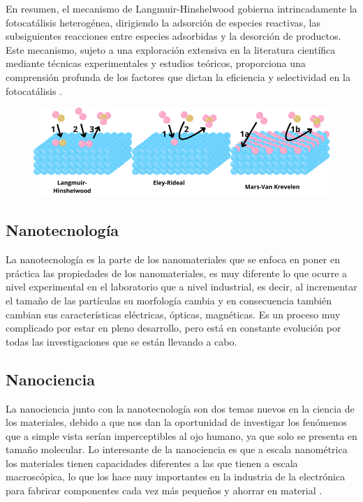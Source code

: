 \documentclass[12pt]{article}
\begin{document}
En resumen, el mecanismo de Langmuir-Hinshelwood gobierna intrincadamente la fotocatálisis heterogénea, dirigiendo la adsorción de especies reactivas, las subsiguientes reacciones entre especies adsorbidas y la desorción de productos. Este mecanismo, sujeto a una exploración extensiva en la literatura científica mediante técnicas experimentales y estudios teóricos, proporciona una comprensión profunda de los factores que dictan la eficiencia y selectividad en la fotocatálisis \cite{IEEEreferencias:Ref10}. 
\begin{figure}[H]
    	   \begin{center}
     	  	\includegraphics[width = 1\textwidth]{Imagenes/MetodosFotocatalisis.png}
    	   \end{center} 
        \end{figure}
\subsection{Nanotecnología}
    La nanotecnología es la parte de los nanomateriales que se enfoca en poner en práctica las propiedades de los nanomateriales, es muy diferente lo que ocurre a nivel experimental en el laboratorio que a nivel industrial, es decir, al incrementar el tamaño de las partículas su morfología cambia y en consecuencia también cambian sus características eléctricas, ópticas, magnéticas. Es un proceso muy complicado por estar en pleno desarrollo, pero está en constante evolución por todas las investigaciones que se están llevando a cabo.\cite{IEEEreferencias:Ref1}
    \subsection{Nanociencia}
    La nanociencia junto con la nanotecnología son dos temas nuevos en la ciencia de los materiales, debido a que nos dan la oportunidad de investigar los fenómenos que a simple vista serían imperceptibles al ojo humano, ya que solo se presenta en tamaño molecular. Lo interesante de la nanociencia es que a escala nanométrica los materiales tienen capacidades diferentes a las que tienen a escala macroscópica, lo que los hace muy importantes en la industria de la electrónica para fabricar componentes cada vez más pequeños y ahorrar en material \cite{IEEEreferencias:Ref1}.
\end{document}
